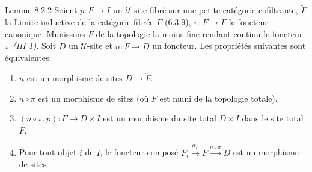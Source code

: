 \documentclass[10pt]{../fichiers-configuration-latex/smfart}
\begin{document}
\begin{enonce*}{Lemme 8.2.2}
Soient $p : F \to I$ un $𝒰$-site fibré sur une petite catégorie
cofiltrante, $\underleftarrow{F}$ la Limite inductive de la catégorie
fibrée $F$ (6.3.9), $\pi : F \to \underleftarrow{F}$ le foncteur
canonique. Munissons $\underleftarrow{F}$ de la topologie la moins fine
rendant continu le foncteur $\pi$ \emph{(III 1)}. Soit $D$ un
$𝒰$-site et $n : \underleftarrow{F} \to D$ un foncteur. Les propriétés suivantes sont
équivalentes:
\begin{enumerate}
\renewcommand{\theenumi}{\roman{enumi}}
\renewcommand{\labelenumi}{\theenumi)}
\item $n$ est un morphisme de sites $D \to \underleftarrow{F}$.

\item $n \circ \pi$ est un morphisme de sites (où $F$ est muni de la
  topologie totale).

\item $(n \circ \pi, p) :  F \to D \times I$ est un morphisme du site
  total $D \times I$ dans le site total $F$.

\item Pour tout objet $i$ de $I$, le foncteur composé $F_i
  \xrightarrow{\alpha_{i!}} F \xrightarrow{n \circ \pi} D$ est un
  morphisme de sites.
\end{enumerate}
\end{enonce*}
\end{document}

